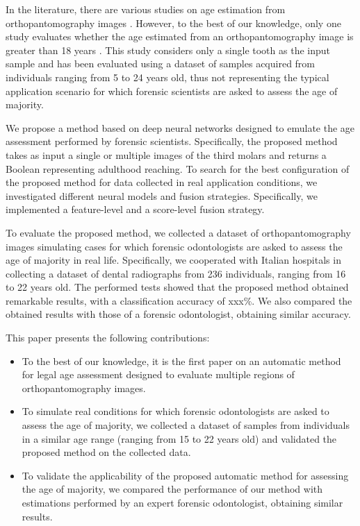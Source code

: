 \documentclass[conference]{IEEEtran}
\begin{document}
In the literature, there are various studies on age estimation from orthopantomography images \cite{survey}. However, to the best of our knowledge, only one study evaluates whether the age estimated from an orthopantomography image is greater than 18 years \cite{PMID33661340}. This study considers only a single tooth as the input sample and has been evaluated using a dataset of samples acquired from individuals ranging from 5 to 24 years old, thus not representing the typical application scenario for which forensic scientists are asked to assess the age of majority.

We propose a method based on deep neural networks designed to emulate the age assessment performed by forensic scientists. Specifically, the proposed method takes as input a single or multiple images of the third molars and returns a Boolean representing adulthood reaching. To search for the best configuration of the proposed method for data collected in real application conditions, we investigated different neural models and fusion strategies. Specifically, we implemented a feature-level and a score-level fusion strategy.

To evaluate the proposed method, we collected a dataset of orthopantomography images simulating cases for which forensic odontologists are asked to assess the age of majority in real life. Specifically, we cooperated with Italian hospitals in collecting a dataset of dental radiographs from 236 individuals, ranging from 16 to 22 years old. The performed tests showed that the proposed method obtained remarkable results, with a classification accuracy of xxx\%. We also compared the obtained results with those of a forensic odontologist, obtaining similar accuracy.


This paper presents the following contributions:
\begin{itemize}
\item To the best of our knowledge, it is the first paper on an automatic method for legal age assessment designed to evaluate multiple regions of orthopantomography images.
\item To simulate real conditions for which forensic odontologists are asked to assess the age of majority, we collected a dataset of samples from individuals in a similar age range (ranging from 15 to 22 years old) and validated the proposed method on the collected data.
\item To validate the applicability of the proposed automatic method for assessing the age of majority, we compared the performance of our method with estimations performed by an expert forensic odontologist, obtaining similar results.
\end{itemize}
\end{document}
